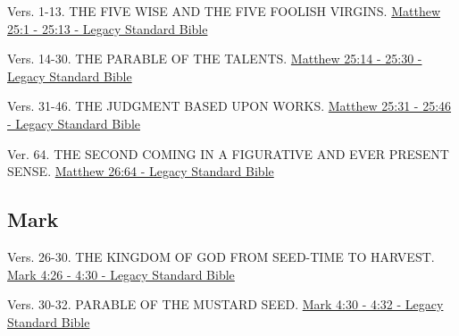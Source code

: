 \documentclass[
  ignorenonframetext,
]{beamer}
\begin{document}
\begin{frame}{25}
\label{section-158}
\begin{block}{Vers. 1-13. THE FIVE WISE AND THE FIVE FOOLISH VIRGINS.}
\label{vers.-1-13.-the-five-wise-and-the-five-foolish-virgins.}
\href{https://read.lsbible.org/?q=matt25\%3A1-13}{Matthew 25:1 - 25:13 -
Legacy Standard Bible}
\end{block}

\begin{block}{Vers. 14-30. THE PARABLE OF THE TALENTS.}
\label{vers.-14-30.-the-parable-of-the-talents.}
\href{https://read.lsbible.org/?q=matt25\%3A14-30}{Matthew 25:14 - 25:30
- Legacy Standard Bible}
\end{block}

\begin{block}{Vers. 31-46. THE JUDGMENT BASED UPON WORKS.}
\label{vers.-31-46.-the-judgment-based-upon-works.}
\href{https://read.lsbible.org/?q=matt25\%3A31-46}{Matthew 25:31 - 25:46
- Legacy Standard Bible}
\end{block}
\end{frame}

\begin{frame}{26}
\label{section-159}
\begin{block}{Ver. 64. THE SECOND COMING IN A FIGURATIVE AND EVER
PRESENT SENSE.}
\label{ver.-64.-the-second-coming-in-a-figurative-and-ever-present-sense.}
\href{https://read.lsbible.org/?q=matt26\%3A64}{Matthew 26:64 - Legacy
Standard Bible}
\end{block}
\end{frame}

\subsection{Mark}\label{mark}

\begin{frame}{4}
\label{section-160}
\begin{block}{Vers. 26-30. THE KINGDOM OF GOD FROM SEED-TIME TO
HARVEST.}
\label{vers.-26-30.-the-kingdom-of-god-from-seed-time-to-harvest.}
\href{https://read.lsbible.org/?q=mk4\%3A26-30}{Mark 4:26 - 4:30 -
Legacy Standard Bible}
\end{block}

\begin{block}{Vers. 30-32. PARABLE OF THE MUSTARD SEED.}
\label{vers.-30-32.-parable-of-the-mustard-seed.}
\href{https://read.lsbible.org/?q=mk4\%3A30-32}{Mark 4:30 - 4:32 -
Legacy Standard Bible}
\end{block}
\end{frame}
\end{document}

